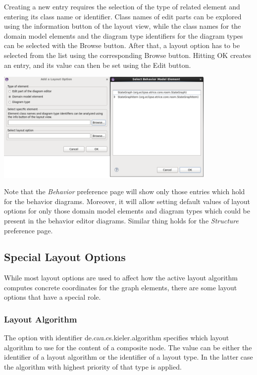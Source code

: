Creating a new entry requires the selection of the type of related element and entering its class name or 
identifier. Class names of edit parts can be explored using the information button of the layout view, 
while the class names for the domain model elements and the diagram type identifiers for the diagram types 
can be selected with the Browse button. After that, a layout option has to be selected from the list using 
the corresponding Browse button. Hitting OK creates an entry, and its value can then be set using the Edit 
button.

\includegraphics[width=0.8\textwidth]{images/043-PreferencePage.png}

Note that the \textit{Behavior} preference page will show only those entries which hold for the behavior 
diagrams. Moreover, it will allow setting default values of layout options for only those domain model 
elements and diagram types which could be present in the behavior editor diagrams. Similar thing holds for 
the \textit{Structure} preference page.

\subsection{\label{specialOptions}Special Layout Options}

While most layout options are used to affect how the active layout algorithm computes concrete coordinates 
for the graph elements, there are some layout options that have a special role.

\subsubsection{Layout Algorithm}

The option with identifier de.cau.cs.kieler.algorithm specifies which layout algorithm to use for the 
content of a composite node. The value can be either the identifier of a layout algorithm or the 
identifier of a layout type. In the latter case the algorithm with highest priority of that type is applied.

